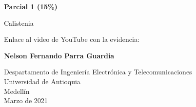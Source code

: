 \documentclass{article}
\begin{document}
\begin{titlepage}
    \begin{center}
        \vspace*{1cm}
            
        \Huge
        \textbf{Parcial 1 (15\%)}
            
        \vspace{0.5cm}
        \LARGE
        Calistenia
        \vspace{0.5cm}
        
        Enlace al video de YouTube con la evidencia: \href{https://youtu.be/fs0ttvP09yI}
            
        \vspace{1.5cm}
            
        \textbf{Nelson Fernando Parra Guardia}
            
        \vfill
            
        \vspace{0.8cm}
            
        \Large
        Despartamento de Ingeniería Electrónica y Telecomunicaciones\\
        Universidad de Antioquia\\
        Medellín\\
        Marzo de 2021
            
    \end{center}
\end{titlepage}

\newpage
\end{document}
